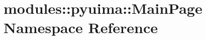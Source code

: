 \hypertarget{namespacemodules_1_1pyuima_1_1MainPage}{\section{modules\-:\-:pyuima\-:\-:\-Main\-Page \-Namespace \-Reference}
\label{namespacemodules_1_1pyuima_1_1MainPage}
}
